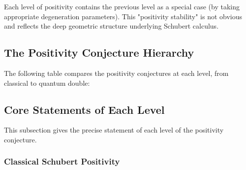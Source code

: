 Each level of positivity contains the previous level as a special case (by taking appropriate degeneration parameters). This "positivity stability" is not obvious and reflects the deep geometric structure underlying Schubert calculus.

\subsection{The Positivity Conjecture Hierarchy}
\label{sec:PositivityConjectureHierarchyTable}

The following table compares the positivity conjectures at each level, from classical to quantum double:


\begin{center}
\small
{}
\end{center}

\subsection{Core Statements of Each Level}
\label{sec:CoreStatementsEachLevel}

This subsection gives the precise statement of each level of the positivity conjecture.

\subsubsection{Classical Schubert Positivity}
\label{sec:ClassicalSchubertPositivityDetail}

